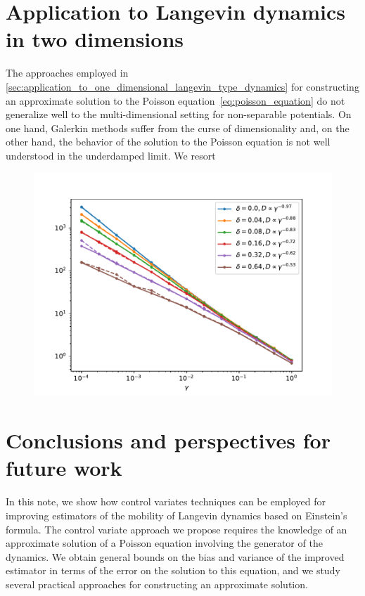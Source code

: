 \documentclass[11pt,a4paper]{article}
\theoremstyle{plain}
\numberwithin{equation}{section}
\begin{document}

\section{Application to Langevin dynamics in two dimensions}%
\label{sec:applications_2d}%
The approaches employed in \cref{sec:application_to_one_dimensional_langevin_type_dynamics} for constructing an approximate solution to the Poisson equation~\eqref{eq:poisson_equation}
do not generalize well to the multi-dimensional setting for non-separable potentials.
On one hand, Galerkin methods suffer from the curse of dimensionality and,
on the other hand, the behavior of the solution to the Poisson equation is not well understood in the underdamped limit.
We resort
\begin{figure}[ht]
    \centering
    \includegraphics[width=0.99\linewidth]{figures/diffusion.pdf}
    \caption{
    }%
    \label{fig:time_bias_variance}
\end{figure}

\section{Conclusions and perspectives for future work}%
\label{sec:conclusions_and_perspectives_for_future_work}
In this note,
we show how control variates techniques can be employed for improving estimators of the mobility of Langevin dynamics based on Einstein's formula.
The control variate approach we propose requires the knowledge of an approximate solution of a Poisson equation involving the generator of the dynamics.
We obtain general bounds on the bias and variance of the improved estimator in terms of the error on the solution to this equation,
and we study several practical approaches for constructing an approximate solution.
\end{document}
